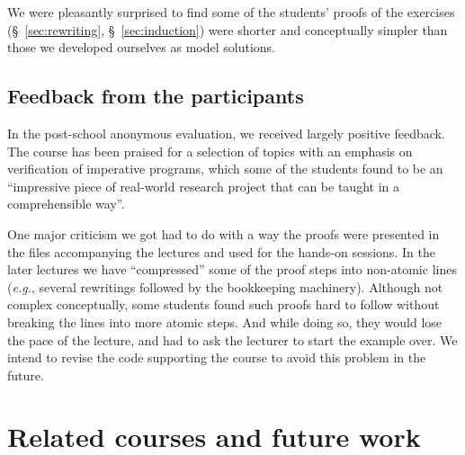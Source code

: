 \documentclass[blockstyle,preprint]{sigplanconf}
\newcommand{\eg}{\emph{e.g.}\xspace}
\begin{document}
We were pleasantly surprised to find some of the students' proofs of
the exercises (\S~\ref{sec:rewriting}, \S~\ref{sec:induction}) were
shorter and conceptually simpler than those we developed ourselves as
model solutions.

\subsection{Feedback from the participants}
\label{sec:feedback}

In the post-school anonymous evaluation, we received largely positive
feedback. The course has been praised for a selection of topics with
an emphasis on verification of imperative programs, which some of the
students found to be an ``impressive piece of real-world research
project that can be taught in a comprehensible way''.

One major criticism we got had to do with a way the proofs were
presented in the files accompanying the lectures and used for the
hands-on sessions. In the later lectures we have ``compressed'' some
of the proof steps into non-atomic lines (\eg, several rewritings
followed by the bookkeeping machinery). Although not complex
conceptually, some students found such proofs hard to follow without
breaking the lines into more atomic steps. And while doing so, they
would lose the pace of the lecture, and had to ask the lecturer to
start the example over. We intend to revise the code supporting the
course to avoid this problem in the future.

\section{Related courses and future work}
\label{sec:related}
\end{document}
